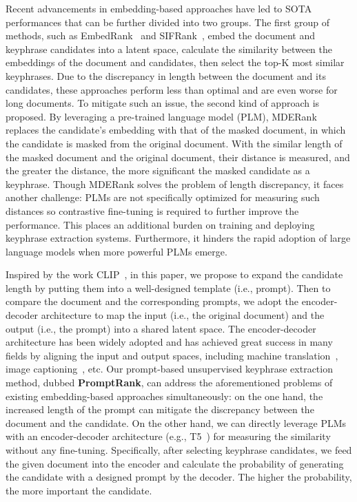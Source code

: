 \documentclass[11pt]{article}
\begin{document}
Recent advancements in embedding-based approaches have led to SOTA performances that can be further divided into two groups. The first group of methods, such as EmbedRank~\cite{bennani-smires-etal-2018-simple} and SIFRank~\cite{8954611}, embed the document and keyphrase candidates into a latent space, calculate the similarity between the embeddings of the document and candidates, then select the top-K most similar keyphrases. Due to the discrepancy in length between the document and its candidates, these approaches perform less than optimal and are even worse for long documents. To mitigate such an issue, the second kind of approach is proposed. By leveraging a pre-trained language model (PLM), MDERank \cite{zhang-etal-2022-mderank} replaces the candidate's embedding with that of the masked document, in which the candidate is masked from the original document. With the similar length of the masked document and the original document, their distance is measured, and the greater the distance, the more significant the masked candidate as a keyphrase. Though MDERank solves the problem of length discrepancy, it faces another challenge: PLMs are not specifically optimized for measuring such distances so contrastive fine-tuning is required to further improve the performance. This places an additional burden on training and deploying keyphrase extraction systems. Furthermore, it hinders the rapid adoption of large language models when more powerful PLMs emerge.



Inspired by the work CLIP~\cite{clip}, in this paper, we propose to expand the candidate length by putting them into a well-designed template (i.e., prompt). Then to compare the document and the corresponding prompts, we adopt the encoder-decoder architecture to map the input (i.e., the original document) and the output (i.e., the prompt) into a shared latent space. The encoder-decoder architecture has been widely adopted and has achieved great success in many fields by aligning the input and output spaces, including machine translation~\cite{NIPS2017_3f5ee243}, image captioning~\cite{pmlr-v37-xuc15}, etc. Our prompt-based unsupervised keyphrase extraction method, dubbed {\bf PromptRank}, can address the aforementioned problems of existing embedding-based approaches simultaneously: on the one hand, the increased length of the prompt can mitigate the discrepancy between the document and the candidate. On the other hand, we can directly leverage PLMs with an encoder-decoder architecture (e.g., T5~\cite{raffel2020exploring}) for measuring the similarity without any fine-tuning. Specifically, after selecting keyphrase candidates, we feed the given document into the encoder and calculate the probability of generating the candidate with a designed prompt by the decoder. The higher the probability, the more important the candidate. 
\end{document}
